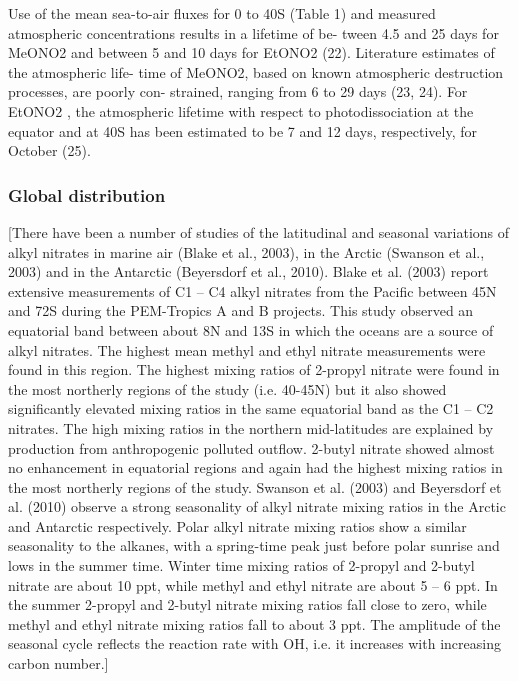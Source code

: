 \documentclass[11pt,a4paper]{article}
\begin{document}
\citep{Chuck2002}
Use of the mean sea-to-air fluxes for 0 to 40S (Table 1) and measured atmospheric concentrations results in a lifetime of be- tween 4.5 and 25 days for MeONO2 and between 5 and 10 days for EtONO2 (22). Literature estimates of the atmospheric life- time of MeONO2, based on known atmospheric destruction processes, are poorly con- strained, ranging from 6 to 29 days (23, 24). For EtONO2
, the atmospheric lifetime with respect to photodissociation at the equator and at 40S has been estimated to be 7 and 12 days, respectively, for October (25).

\subsubsection*{Global distribution}
\citep{Newland2013}
[There have been a number of studies of the latitudinal and seasonal variations of alkyl nitrates in marine air (Blake et al., 2003), in the Arctic (Swanson et al., 2003) and in the Antarctic (Beyersdorf et al., 2010).
Blake et al. (2003) report extensive measurements of C1 – C4 alkyl nitrates from the Pacific between 45N and 72S during the PEM-Tropics A and B projects. This study observed an equatorial band between about 8N and 13S in which the oceans are a source of alkyl nitrates. The highest mean methyl and ethyl nitrate measurements were found in this region. The highest mixing ratios of 2-propyl nitrate were found in the most northerly regions of the study (i.e. 40-45N) but it also showed significantly elevated mixing ratios in the same equatorial band as the C1 – C2 nitrates. The high mixing ratios in the northern mid-latitudes are explained by production from anthropogenic polluted outflow. 2-butyl nitrate showed almost no enhancement in equatorial regions and again had the highest mixing ratios in the most northerly regions of the study.
Swanson et al. (2003) and Beyersdorf et al. (2010) observe a strong seasonality of alkyl nitrate mixing ratios in the Arctic and Antarctic respectively. Polar alkyl nitrate mixing ratios show a similar seasonality to the alkanes, with a spring-time peak just before polar sunrise and lows in the summer time. Winter time mixing ratios of 2-propyl and 2-butyl nitrate are about 10 ppt, while methyl and ethyl nitrate are about 5 – 6 ppt. In the summer 2-propyl and 2-butyl nitrate mixing ratios fall close to zero, while methyl and ethyl nitrate mixing ratios fall to about 3 ppt. The amplitude of the seasonal cycle reflects the reaction rate with OH, i.e. it increases with increasing carbon number.]
\end{document}
